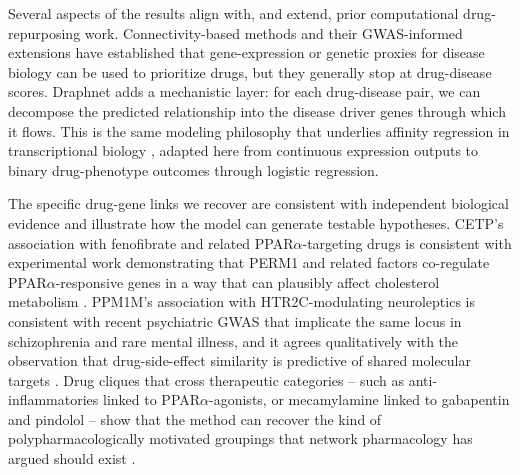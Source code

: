 \documentclass[11pt]{article}
\begin{document}
Several aspects of the results align with, and extend, prior
computational drug-repurposing work. Connectivity-based methods
\citep{lamb2006cmap,subramanian2017lincs,sirota2011drugrepo} and their
GWAS-informed extensions
\citep{so2017neuropsychiatric,reay2020pes,grotzinger2023tsem} have
established that gene-expression or genetic proxies for disease biology
can be used to prioritize drugs, but they generally stop at
drug-disease scores. Draphnet adds a mechanistic layer: for each
drug-disease pair, we can decompose the predicted relationship into
the disease driver genes through which it flows. This is the same
modeling philosophy that underlies affinity regression in
transcriptional biology \citep{osmanbeyoglu2014affinity}, adapted here
from continuous expression outputs to binary drug-phenotype outcomes
through logistic regression.

The specific drug-gene links we recover are consistent with independent
biological evidence and illustrate how the model can generate testable
hypotheses. CETP's association with fenofibrate and related
PPAR$\alpha$-targeting drugs is consistent with experimental work
demonstrating that PERM1 and related factors co-regulate
PPAR$\alpha$-responsive genes in a way that can plausibly affect
cholesterol metabolism \citep{huang2022perm1}. PPM1M's association
with HTR2C-modulating neuroleptics is consistent with recent
psychiatric GWAS that implicate the same locus in schizophrenia and
rare mental illness, and it agrees qualitatively with the
observation that drug-side-effect similarity is predictive of shared
molecular targets \citep{campillos2008sideeffect}. Drug cliques
that cross therapeutic categories -- such as anti-inflammatories
linked to PPAR$\alpha$-agonists, or mecamylamine linked to gabapentin
and pindolol -- show that the method can recover the kind of
polypharmacologically motivated groupings that network pharmacology
has argued should exist \citep{hopkins2008network}.
\end{document}
